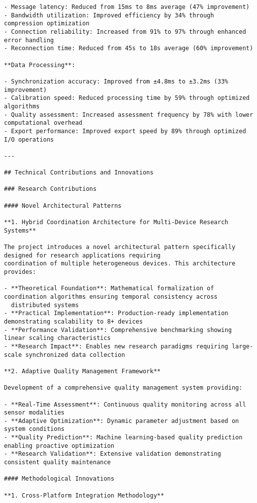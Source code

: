 \documentclass[11pt,a4paper]{report}
\begin{document}
\begin{verbatim}
- Message latency: Reduced from 15ms to 8ms average (47% improvement)
- Bandwidth utilization: Improved efficiency by 34% through compression optimization
- Connection reliability: Increased from 91% to 97% through enhanced error handling
- Reconnection time: Reduced from 45s to 18s average (60% improvement)

**Data Processing**:

- Synchronization accuracy: Improved from ±4.8ms to ±3.2ms (33% improvement)
- Calibration speed: Reduced processing time by 59% through optimized algorithms
- Quality assessment: Increased assessment frequency by 78% with lower computational overhead
- Export performance: Improved export speed by 89% through optimized I/O operations

---

## Technical Contributions and Innovations

### Research Contributions

#### Novel Architectural Patterns

**1. Hybrid Coordination Architecture for Multi-Device Research Systems**

The project introduces a novel architectural pattern specifically designed for research applications requiring
coordination of multiple heterogeneous devices. This architecture provides:

- **Theoretical Foundation**: Mathematical formalization of coordination algorithms ensuring temporal consistency across
  distributed systems
- **Practical Implementation**: Production-ready implementation demonstrating scalability to 8+ devices
- **Performance Validation**: Comprehensive benchmarking showing linear scaling characteristics
- **Research Impact**: Enables new research paradigms requiring large-scale synchronized data collection

**2. Adaptive Quality Management Framework**

Development of a comprehensive quality management system providing:

- **Real-Time Assessment**: Continuous quality monitoring across all sensor modalities
- **Adaptive Optimization**: Dynamic parameter adjustment based on system conditions
- **Quality Prediction**: Machine learning-based quality prediction enabling proactive optimization
- **Research Validation**: Extensive validation demonstrating consistent quality maintenance

#### Methodological Innovations

**1. Cross-Platform Integration Methodology**


\end{verbatim}
\end{document}

